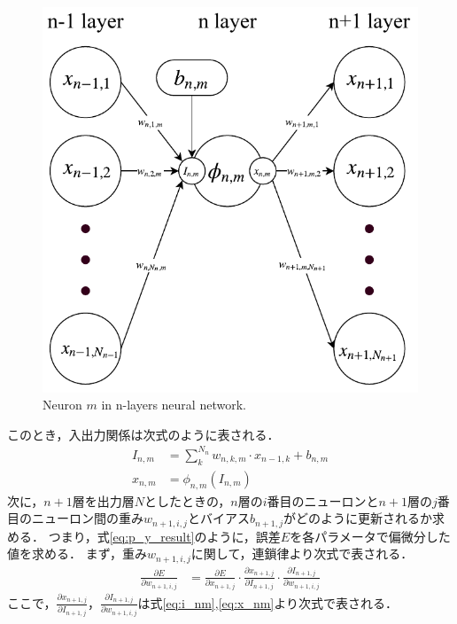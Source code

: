     \begin{figure}[ht]
      \centering
      \includegraphics[width=12cm]{8_appendix/img/n_layer_eq.pdf}
      \caption{Neuron $m$ in n-layers neural network.}
      \label{fig:n_layer_eq}
    \end{figure}
    このとき，入出力関係は次式のように表される．
    \begin{align}
      I_{n, m} &= \sum_{k}^{N_{n}} w_{n, k, m} \cdot x_{n-1, k} + b_{n, m} \label{eq:i_nm} \\
      x_{n, m} &= \phi_{n, m}(I_{n, m}) \label{eq:x_nm}
    \end{align}
    次に，$n+1$層を出力層$N$としたときの，$n$層の$i$番目のニューロンと$n+1$層の$j$番目のニューロン間の重み$w_{n+1, i, j}$とバイアス$b_{n+1, j}$がどのように更新されるか求める．
    つまり，式\ref{eq:p_y_result}のように，誤差$E$を各パラメータで偏微分した値を求める．
    まず，重み$w_{n+1, i, j}$に関して，連鎖律より次式で表される．
    \begin{align}
      \frac{\partial E}{\partial w_{n+1, i, j}} &= \frac{\partial E}{\partial x_{n+1, j}} \cdot \frac{\partial x_{n+1, j}}{\partial I_{n+1, j}} \cdot \frac{\partial I_{n+1, j}}{\partial w_{n+1, i, j}}
      \label{eq:w_nim}
    \end{align}
    ここで，$\frac{\partial x_{n+1, j}}{\partial I_{n+1, j}}$，$\frac{\partial I_{n+1, j}}{\partial w_{n+1, i, j}}$は式\ref{eq:i_nm},\ref{eq:x_nm}より次式で表される．
